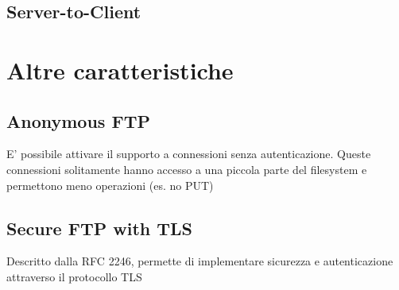 \subsection{Server-to-Client}
\section{Altre caratteristiche}
\subsection{Anonymous FTP}
E' possibile attivare il supporto a connessioni senza autenticazione.
Queste connessioni solitamente hanno accesso a una piccola parte del filesystem e permettono meno operazioni (es. no PUT)
\subsection{Secure FTP with TLS}
Descritto dalla RFC 2246, permette di implementare sicurezza e autenticazione attraverso il protocollo TLS